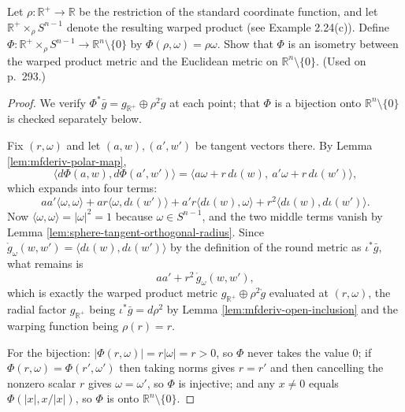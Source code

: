 \begin{exercise}\label{prob:warped-product-isometry}


Let $\rho: \mathbb{R}^+ \to \mathbb{R}$ be the restriction of the standard coordinate function, and let $\mathbb{R}^+ \times_\rho S^{n-1}$ denote the resulting warped product (see Example 2.24(c)). Define $\Phi: \mathbb{R}^+ \times_\rho S^{n-1} \to \mathbb{R}^n \setminus \{0\}$ by $\Phi(\rho,\omega) = \rho\omega$. Show that $\Phi$ is an isometry between the warped product metric and the Euclidean metric on $\mathbb{R}^n \setminus \{0\}$. (Used on p.~293.)
\end{exercise}
\begin{proof}

We verify $\Phi^*\bar{g} = g_{\mathbb{R}^+} \oplus \rho^2 \mathring{g}$ at each point; that $\Phi$ is a bijection onto $\mathbb{R}^n \setminus \{0\}$ is checked separately below.

Fix $(r,\omega)$ and let $(a,w), (a',w')$ be tangent vectors there. By Lemma \ref{lem:mfderiv-polar-map},
\[
\langle d\Phi(a,w), d\Phi(a',w')\rangle
 = \langle a\omega + r\,d\iota(w),\ a'\omega + r\,d\iota(w')\rangle,
\]
which expands into four terms:
\[
a a' \langle\omega,\omega\rangle + a r \langle \omega, d\iota(w')\rangle + a' r \langle d\iota(w), \omega\rangle + r^2 \langle d\iota(w), d\iota(w')\rangle.
\]
Now $\langle\omega,\omega\rangle = |\omega|^2 = 1$ because $\omega \in S^{n-1}$, and the two middle terms vanish by Lemma \ref{lem:sphere-tangent-orthogonal-radius}. Since $\mathring{g}_\omega(w,w') = \langle d\iota(w), d\iota(w')\rangle$ by the definition of the round metric as $\iota^*\bar{g}$, what remains is
\[
a a' + r^2\,\mathring{g}_\omega(w,w'),
\]
which is exactly the warped product metric $g_{\mathbb{R}^+} \oplus \rho^2\mathring{g}$ evaluated at $(r,\omega)$, the radial factor $g_{\mathbb{R}^+}$ being $\iota^*\bar{g} = d\rho^2$ by Lemma \ref{lem:mfderiv-open-inclusion} and the warping function being $\rho(r) = r$.

For the bijection: $|\Phi(r,\omega)| = r|\omega| = r > 0$, so $\Phi$ never takes the value $0$; if $\Phi(r,\omega) = \Phi(r',\omega')$ then taking norms gives $r = r'$ and then cancelling the nonzero scalar $r$ gives $\omega = \omega'$, so $\Phi$ is injective; and any $x \neq 0$ equals $\Phi(|x|, x/|x|)$, so $\Phi$ is onto $\mathbb{R}^n \setminus \{0\}$.
\end{proof}

